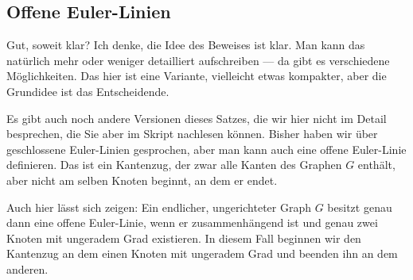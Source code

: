\begin{ai-global-state-checkpoint-invisible-content}
\end{ai-global-state-checkpoint-invisible-content}

\subsection{Offene Euler-Linien}

\begin{spoken-clean}[00:17:28 - 00:18:56]
Gut, soweit klar? Ich denke, die Idee des Beweises ist klar. Man kann das natürlich mehr oder weniger detailliert aufschreiben --- da gibt es verschiedene Möglichkeiten. Das hier ist eine Variante, vielleicht etwas kompakter, aber die Grundidee ist das Entscheidende.

Es gibt auch noch andere Versionen dieses Satzes, die wir hier nicht im Detail besprechen, die Sie aber im Skript nachlesen können. Bisher haben wir über geschlossene Euler-Linien gesprochen, aber man kann auch eine offene Euler-Linie definieren. Das ist ein Kantenzug, der zwar alle Kanten des Graphen $G$ enthält, aber nicht am selben Knoten beginnt, an dem er endet.

Auch hier lässt sich zeigen: Ein endlicher, ungerichteter Graph $G$ besitzt genau dann eine offene Euler-Linie, wenn er zusammenhängend ist und genau zwei Knoten mit ungeradem Grad existieren. In diesem Fall beginnen wir den Kantenzug an dem einen Knoten mit ungeradem Grad und beenden ihn an dem anderen.
\end{spoken-clean}

\begin{math-stroke}

\end{math-stroke}

